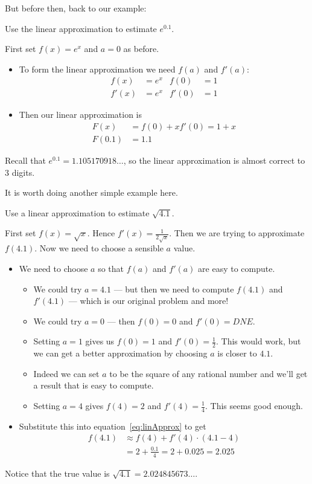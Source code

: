 But before then, back to our example:
\begin{eg}
 Use the linear approximation to estimate $e^{0.1}$.

\soln First set $f(x) = e^x$ and $a=0$ as before.
\begin{itemize}
 \item To form the linear approximation we need $f(a)$ and $f'(a)$:
\begin{align*}
  f(x) &= e^x & f(0) & = 1 \\
  f'(x) &= e^x & f'(0) & = 1
\end{align*}
\item Then our linear approximation is
\begin{align*}
  F(x) &= f(0) + x f'(0) = 1 + x \\
  F(0.1) &= 1.1
\end{align*}
\end{itemize}
Recall that $e^{0.1} = 1.105170918\dots$, so the linear approximation is
almost correct to 3 digits.
\end{eg}

It is worth doing another simple example here.
\begin{eg}
 Use a linear approximation to estimate $\sqrt{4.1}$.

\soln First set $f(x)=\sqrt{x}$. Hence $f'(x) = \frac{1}{2\sqrt{x}}$. Then we are trying
to approximate $f(4.1)$. Now we need to choose a sensible $a$ value.
\begin{itemize}
 \item We need to choose $a$ so that $f(a)$ and $f'(a)$ are easy to compute.
\begin{itemize}
 \item We could try $a=4.1$ --- but then we need to compute $f(4.1)$ and $f'(4.1)$ ---
which is our original problem and more!
\item We could try $a=0$ --- then $f(0)=0$ and $f'(0) = DNE$.
\item Setting $a=1$ gives us $f(0)=1$ and $f'(0)=\frac{1}{2}$. This would work, but we
can get a better approximation by choosing $a$ is closer to $4.1$.
\item Indeed we can set $a$ to be the square of any rational number and we'll get a
result that is easy to compute.
\item Setting $a=4$ gives $f(4)=2$ and $f'(4) = \frac{1}{4}$. This seems good enough.
\end{itemize}
\item Substitute this into equation~\eqref{eq:linApprox} to get
\begin{align*}
  f(4.1) &\approx f(4) + f'(4) \cdot(4.1-4) \\
  &= 2 + \frac{0.1}{4} = 2 + 0.025 = 2.025
\end{align*}
\end{itemize}
Notice that the true value is $\sqrt{4.1} = 2.024845673\dots$.
\end{eg}




